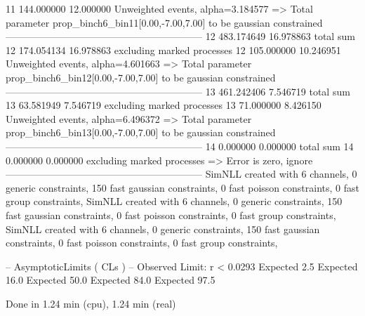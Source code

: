 11         144.000000      12.000000       Unweighted events, alpha=3.184577
  => Total parameter prop_binch6_bin11[0.00,-7.00,7.00] to be gaussian constrained
------------------------------------------------------------
12         483.174649      16.978863       total sum                     
12         174.054134      16.978863       excluding marked processes    
12         105.000000      10.246951       Unweighted events, alpha=4.601663
  => Total parameter prop_binch6_bin12[0.00,-7.00,7.00] to be gaussian constrained
------------------------------------------------------------
13         461.242406      7.546719        total sum                     
13         63.581949       7.546719        excluding marked processes    
13         71.000000       8.426150        Unweighted events, alpha=6.496372
  => Total parameter prop_binch6_bin13[0.00,-7.00,7.00] to be gaussian constrained
------------------------------------------------------------
14         0.000000        0.000000        total sum                     
14         0.000000        0.000000        excluding marked processes    
  => Error is zero, ignore      
------------------------------------------------------------
SimNLL created with 6 channels, 0 generic constraints, 150 fast gaussian constraints, 0 fast poisson constraints, 0 fast group constraints, 
SimNLL created with 6 channels, 0 generic constraints, 150 fast gaussian constraints, 0 fast poisson constraints, 0 fast group constraints, 
SimNLL created with 6 channels, 0 generic constraints, 150 fast gaussian constraints, 0 fast poisson constraints, 0 fast group constraints, 

 -- AsymptoticLimits ( CLs ) --
Observed Limit: r < 0.0293
Expected  2.5%
Expected 16.0%
Expected 50.0%
Expected 84.0%
Expected 97.5%

Done in 1.24 min (cpu), 1.24 min (real)
